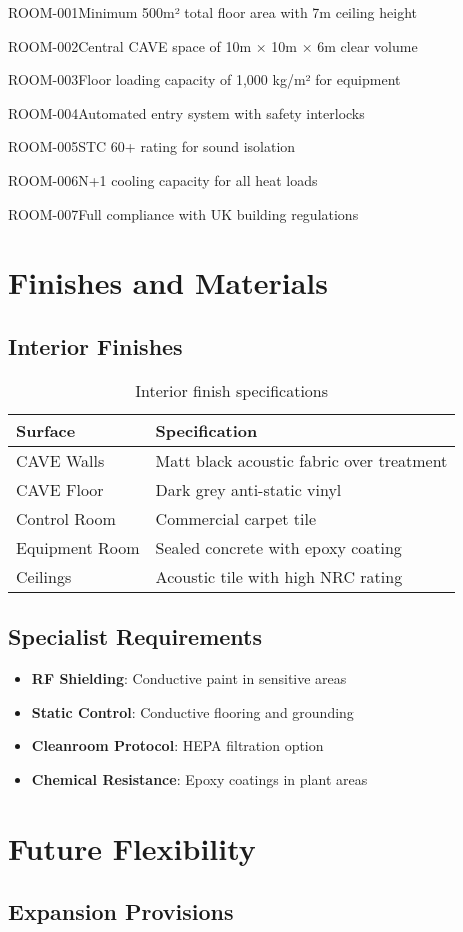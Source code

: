 \begin{requirement}{ROOM-001}{Minimum 500m² total floor area with 7m ceiling height}
\begin{requirement}{ROOM-002}{Central CAVE space of 10m × 10m × 6m clear volume}
\begin{requirement}{ROOM-003}{Floor loading capacity of 1,000 kg/m² for equipment}
\begin{requirement}{ROOM-004}{Automated entry system with safety interlocks}
\begin{requirement}{ROOM-005}{STC 60+ rating for sound isolation}
\begin{requirement}{ROOM-006}{N+1 cooling capacity for all heat loads}
\begin{requirement}{ROOM-007}{Full compliance with UK building regulations}
\section{Finishes and Materials}

\subsection{Interior Finishes}

\begin{table}[H]
\centering
\begin{tabularx}{\textwidth}{@{}lX@{}}
\toprule
\textbf{Surface} & \textbf{Specification} \\
\midrule
CAVE Walls & Matt black acoustic fabric over treatment \\
CAVE Floor & Dark grey anti-static vinyl \\
Control Room & Commercial carpet tile \\
Equipment Room & Sealed concrete with epoxy coating \\
Ceilings & Acoustic tile with high NRC rating \\
\bottomrule
\end{tabularx}
\caption{Interior finish specifications}
\end{table}

\subsection{Specialist Requirements}

\begin{itemize}
    \item \textbf{RF Shielding}: Conductive paint in sensitive areas
    \item \textbf{Static Control}: Conductive flooring and grounding
    \item \textbf{Cleanroom Protocol}: HEPA filtration option
    \item \textbf{Chemical Resistance}: Epoxy coatings in plant areas
\end{itemize}

\section{Future Flexibility}

\subsection{Expansion Provisions}


\end{requirement}
\end{requirement}
\end{requirement}
\end{requirement}
\end{requirement}
\end{requirement}
\end{requirement}
